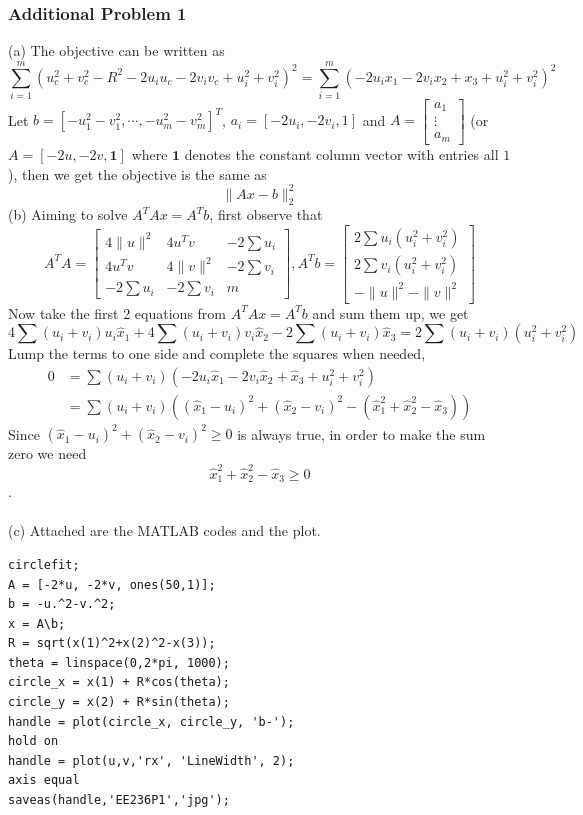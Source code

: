 \documentclass[12pt,a4paper]{article}
\renewcommand{\l}{\left}\renewcommand{\r}{\right}
\newcommand{\SUM}[2]{\sum\limits_{#1}^{#2}}
\begin{document}
\newpage\subsubsection*{Additional Problem 1}
\noindent (a) The objective can be written as 
$$\SUM{i=1}m (u_c^2 + v_c^2 - R^2 - 2u_i u_c - 2v_iv_c + u_i^2 + v_i^2)^2 = \SUM{i=1}m (-2u_ix_1 -2v_ix_2 + x_3 + u_i^2 + v_i^2)^2$$
Let $b = [-u_1^2-v_1^2, \cdots, -u_m^2-v_m^2]^T$, $a_i = [-2u_i, -2v_i, 1]$ and $A = \l[\begin{array}{c}
a_1\\
\vdots\\
a_m\end{array}\r]$ (or $A = [-2u, -2v, \mathbf{1}]$ where $\mathbf{1}$ denotes the constant column vector with entries all $1$), then we get the objective is the same as 
$$\|Ax-b\|_2^2$$
(b) Aiming to solve $A^TAx = A^Tb$, first observe that
$$A^TA = \l[\begin{array}{ccc}
4\|u\|^2 & 4u^Tv & -2\sum u_i \\
4u^Tv & 4\|v\|^2 & -2\sum v_i \\
-2\sum u_i & -2\sum v_i & m\end{array}\r], A^Tb = \l[\begin{array}{c}
2\sum u_i(u_i^2+v_i^2)\\
2\sum v_i(u_i^2+v_i^2)\\
-\|u\|^2 - \|v\|^2\end{array}\r]$$
Now take the first 2 equations from $A^TAx = A^Tb$ and sum them up, we get
$$4\sum (u_i+v_i)u_i \hat x_1 + 4\sum (u_i+v_i)v_i\hat x_2 - 2\sum(u_i+v_i)\hat x_3 = 2\sum (u_i+v_i)(u_i^2 + v_i^2)$$
Lump the terms to one side and complete the squares when needed,
\begin{align*}
0 &= \sum (u_i+v_i) (-2u_i\hat x_1 - 2v_i\hat x_2 +\hat x_3 + u_i^2 + v_i^2)\\
&= \sum (u_i+v_i) ((\hat x_1-u_i)^2 + (\hat x_2-v_i)^2 - (\hat x_1^2 + \hat x_2^2 - \hat x_3))
\end{align*}
Since $(\hat x_1-u_i)^2 + (\hat x_2-v_i)^2 \geq 0$ is always true, in order to make the sum zero we need 
$$\hat x_1^2 + \hat x_2^2 - \hat x_3\geq 0$$.\\
\\
(c) Attached are the MATLAB codes and the plot.
\begin{verbatim}
circlefit;
A = [-2*u, -2*v, ones(50,1)];
b = -u.^2-v.^2;
x = A\b;
R = sqrt(x(1)^2+x(2)^2-x(3));
theta = linspace(0,2*pi, 1000);
circle_x = x(1) + R*cos(theta);
circle_y = x(2) + R*sin(theta);
handle = plot(circle_x, circle_y, 'b-');
hold on
handle = plot(u,v,'rx', 'LineWidth', 2);
axis equal
saveas(handle,'EE236P1','jpg');
\end{verbatim}
\end{document}
